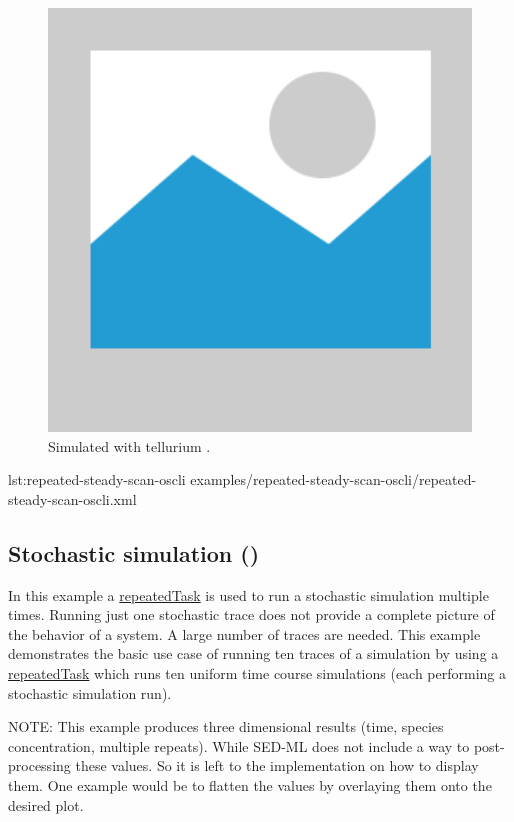 \begin{figure}[ht]
\begin{minipage}{0.47\textwidth}
        \includegraphics[width=1.0\textwidth]{examples/placeholder}
        \caption{Simulated with tellurium \citep{tellurium}.}
    \end{minipage}
    \label{fig:repeated-steady-scan-oscli}
\end{figure}

{lst:repeated-steady-scan-oscli}
{examples/repeated-steady-scan-oscli/repeated-steady-scan-oscli.xml}


\subsection{Stochastic simulation ()}
In this example a \hyperref[class:repeatedTask]{repeatedTask} is used to run a stochastic simulation multiple times.
Running just one stochastic trace does not provide a complete picture of the behavior of a system. A large number of traces are needed. This example demonstrates the basic use case of running ten traces of a simulation by using a \hyperref[class:repeatedTask]{repeatedTask} which runs ten uniform time course simulations (each performing a stochastic simulation run).

NOTE: This example produces three dimensional results (time, species concentration, multiple repeats). While SED-ML \currentLV does not include a way to post-processing these values. So it is left to the implementation on how to display them. One example would be to flatten the values by overlaying them onto the desired plot. 

